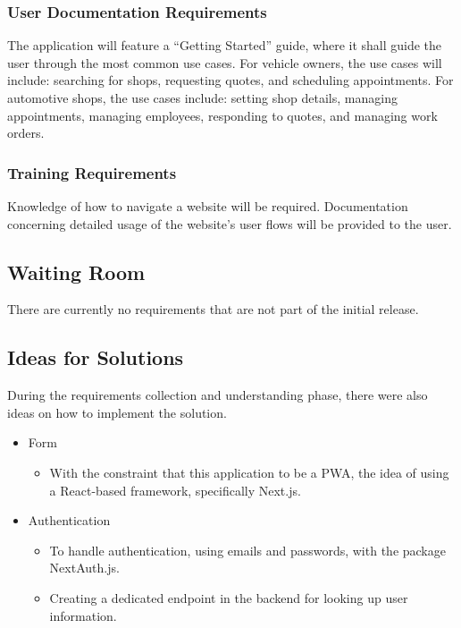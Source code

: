 \documentclass[12pt]{article}
\begin{document}
\subsubsection{User Documentation Requirements}

The application will feature a ``Getting Started'' guide, where it shall guide the user through the
most common use cases. For vehicle owners, the use cases will include: searching for shops,
requesting quotes, and scheduling appointments. For automotive shops, the use cases include:
setting shop details, managing appointments, managing employees, responding to quotes, and managing
work orders.

\subsubsection{Training Requirements}

Knowledge of how to navigate a website will be required. Documentation concerning detailed usage of
the website's user flows will be provided to the user.

\subsection{Waiting Room}

There are currently no requirements that are not part of the initial release.

\subsection{Ideas for Solutions}

During the requirements collection and understanding phase, there were also ideas on how to
implement the solution.

\begin{itemize}
	\item Form
	      \begin{itemize}
		      \item With the constraint that this application to be a PWA, the idea of using a React-based framework,
		            specifically Next.js.
	      \end{itemize}
	\item Authentication
	      \begin{itemize}
		      \item To handle authentication, using emails and passwords, with the package NextAuth.js.
		      \item Creating a dedicated endpoint in the backend for looking up user information.
	      \end{itemize}
\end{itemize}
\end{document}
